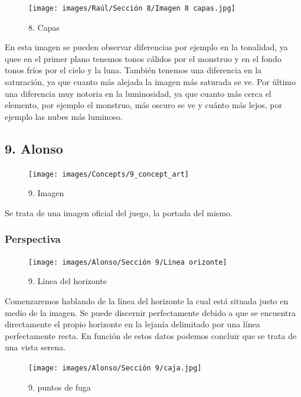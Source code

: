 \documentclass[12pt]{article}
\begin{document}
\begin{figure}[H]
      \centering
      \texttt{[image: images/Raúl/Sección 8/Imagen 8 capas.jpg]}
      \caption{\small 8. Capas}
    \end{figure}

En esta imagen se pueden observar diferencias por ejemplo en la tonalidad, ya quee en el primer plano tenemos tonos cálidos por el monstruo y en el fondo tonos fríos por el cielo y la luna. También tenemos una diferencia en la saturación, ya que cuanto más alejada la imagen más saturada se ve. Por último una diferencia muy notoria en la luminosidad, ya que cuanto más cerca el elemento, por ejemplo el monstruo, más oscuro se ve y cuánto más lejos, por ejemplo las nubes más luminoso.

        \newpage


    \subsection{9. Alonso}
    \begin{figure}[H]
      \centering
      \texttt{[image: images/Concepts/9\_concept\_art]}
      \caption{\small 9. Imagen}
    \end{figure}
    Se trata de una imagen oficial del juego, la portada del mismo.

        \subsubsection{Perspectiva}

    \begin{figure}[H]
      \centering
      \texttt{[image: images/Alonso/Sección 9/Linea orizonte]}
      \caption{\small 9. Línea del horizonte}
    \end{figure}

    Comenzaremos hablando de la línea del horizonte la cual está situada justo en medio de la imagen. Se puede discernir perfectamente debido a que se encuentra directamente el propio horizonte en la lejanía delimitado por una línea perfectamente recta. En función de estos datos podemos concluir  que se trata de una vista serena.

    \begin{figure}[H]
      \centering
      \texttt{[image: images/Alonso/Sección 9/caja.jpg]}
      \caption{\small 9. puntos de fuga}
    \end{figure}
\end{document}
